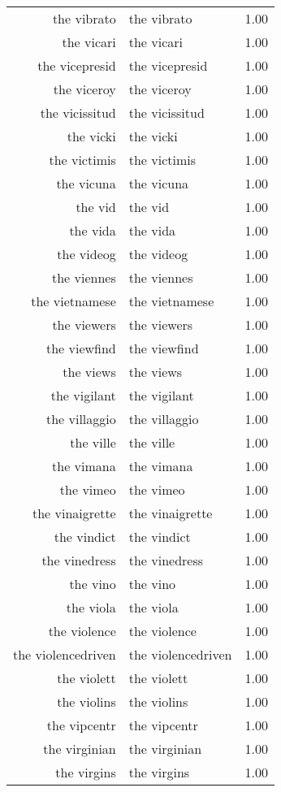 \begin{table}[ht]
\begin{tabular}{rlr}
  the vibrato & the vibrato & 1.00 \\ 
  the vicari & the vicari & 1.00 \\ 
  the vicepresid & the vicepresid & 1.00 \\ 
  the viceroy & the viceroy & 1.00 \\ 
  the vicissitud & the vicissitud & 1.00 \\ 
  the vicki & the vicki & 1.00 \\ 
  the victimis & the victimis & 1.00 \\ 
  the vicuna & the vicuna & 1.00 \\ 
  the vid & the vid & 1.00 \\ 
  the vida & the vida & 1.00 \\ 
  the videog & the videog & 1.00 \\ 
  the viennes & the viennes & 1.00 \\ 
  the vietnamese & the vietnamese & 1.00 \\ 
  the viewers & the viewers & 1.00 \\ 
  the viewfind & the viewfind & 1.00 \\ 
  the views & the views & 1.00 \\ 
  the vigilant & the vigilant & 1.00 \\ 
  the villaggio & the villaggio & 1.00 \\ 
  the ville & the ville & 1.00 \\ 
  the vimana & the vimana & 1.00 \\ 
  the vimeo & the vimeo & 1.00 \\ 
  the vinaigrette & the vinaigrette & 1.00 \\ 
  the vindict & the vindict & 1.00 \\ 
  the vinedress & the vinedress & 1.00 \\ 
  the vino & the vino & 1.00 \\ 
  the viola & the viola & 1.00 \\ 
  the violence & the violence & 1.00 \\ 
  the violencedriven & the violencedriven & 1.00 \\ 
  the violett & the violett & 1.00 \\ 
  the violins & the violins & 1.00 \\ 
  the vipcentr & the vipcentr & 1.00 \\ 
  the virginian & the virginian & 1.00 \\ 
  the virgins & the virgins & 1.00 \\ 

\end{tabular}
\end{table}
